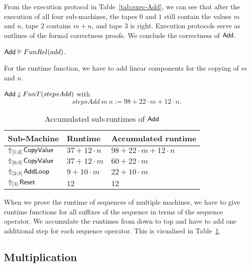 From the execution protocol in Table~\ref{tab:exec-Add}, we can see that after the execution of all four sub-machines, the tapes $0$ and $1$ still
contain the values $m$ and $n$, tape $2$ contains $m+n$, and tape $3$ is right.  Execution protocols serve as outlines of the formal correctness
proofs.  We conclude the correctness of $\MS{Add}$.
\begin{lemma}
  \label{lem:Add_Computes}
  $\MS{Add} \Realise FunRel(add)$.
\end{lemma}

For the runtime function, we have to add linear components for the copying of $m$ and $n$.
\begin{lemma}
  $\MS{Add} \downarrow FunT(stepsAdd)$ with
  \[
    stepsAdd~m~n := 98 + 22 \cdot m + 12 \cdot n.
  \]
\end{lemma}

\begin{table}[h]
  \centering
  \begin{tabular}{l|l|l}
    Sub-Machine & Runtime & Accumulated runtime \\ \hline
    $\LiftTapes{\MS{CopyValue}}{\Vector{1;2}}$  & $37 + 12 \cdot n$ & $98 + 22 \cdot m + 12 \cdot n$ \\
    $\LiftTapes{\MS{CopyValue}}{\Vector{0;3}}$  & $37 + 12 \cdot m$ & $60 + 22 \cdot m$ \\
    $\LiftTapes{\MS{AddLoop}}{\Vector{2;3}}$    & $9 + 10 \cdot m$  & $22 + 10 \cdot m$ \\
    $\LiftTapes{\MS{Reset}}{\Vector{3}}$        & $12$              & $12$ \\
  \end{tabular}
  \caption{Accumulated sub-runtimes of $\MS{Add}$}
  \label{tab:runtime-Add}
\end{table}

When we prove the runtime of sequences of multiple machines, we have to give runtime functions for all suffixes of the sequence in terms of the
sequence operator.  We accumulate the runtimes from down to top and have to add one additional step for each sequence operator.  This is visualised in
Table~\ref{tab:runtime-Add}.


\subsection{Multiplication}
\label{sec:Mult}


